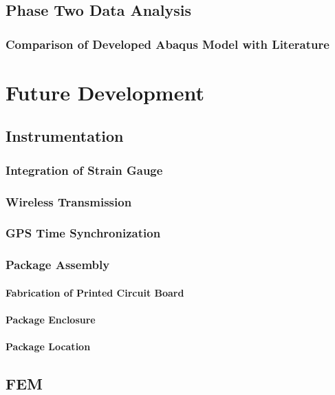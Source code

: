 \documentclass[12pt]{report}
\begin{document}
	\section{Phase Two Data Analysis}
		\subsection{Comparison of Developed Abaqus Model with Literature}
			
		
\chapter{Future Development}
\label{ch:FutureDevelopment}
	\section{Instrumentation}
		\subsection{Integration of Strain Gauge}
			
		\subsection{Wireless Transmission}
			\label{sec:XBeeFuture}
			
		\subsection{GPS Time Synchronization}
			
		\subsection{Package Assembly}
			\subsubsection{Fabrication of Printed Circuit Board}
				
			\subsubsection{Package Enclosure}
				
			\subsubsection{Package Location}
				
	\section{FEM}
		
		
\end{document}
